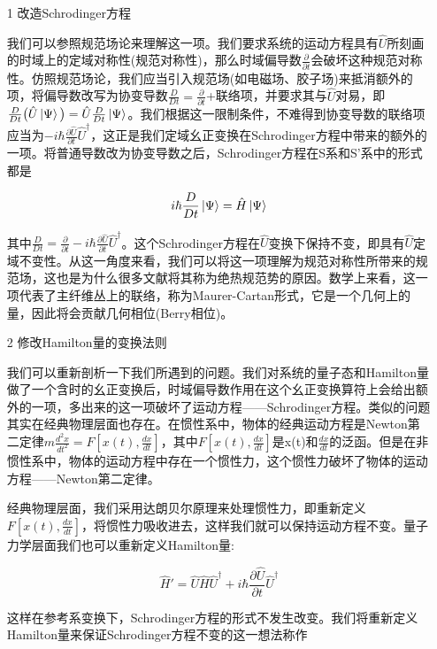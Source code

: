 \documentclass[a4paper]{article}
\begin{document}
        \begin{itemize}
            \item[1] 改造Schrodinger方程
                
                我们可以参照规范场论来理解这一项。我们要求系统的运动方程具有$\hat{U}$所刻画的时域上的定域对称性(规范对称性)，那么时域偏导数$\frac{\partial}{\partial t}$会破坏这种规范对称性。仿照规范场论，我们应当引入规范场(如电磁场、胶子场)来抵消额外的项，将偏导数改写为协变导数$\frac{D}{Dt}=\frac{\partial}{\partial t}$+联络项，并要求其与$\hat{U}$对易，即$\frac{D}{Dt}\big(\hat{U}\ket{\Psi}\big)=\hat{U}\frac{D}{Dt}\ket{\Psi}$。我们根据这一限制条件，不难得到协变导数的联络项应当为$-i\hbar\frac{\partial\hat{U}}{\partial t}\hat{U}^\dagger$，这正是我们定域幺正变换在Schrodinger方程中带来的额外的一项。将普通导数改为协变导数之后，Schrodinger方程在S系和S'系中的形式都是
    
                \begin{equation}
                    i\hbar\frac{D}{Dt}\ket{\Psi} = \hat{H}\ket{\Psi}
                \end{equation}
    
                其中$\frac{D}{Dt}=\frac{\partial}{\partial t}-i\hbar\frac{\partial\hat{U}}{\partial t}\hat{U}^\dagger$。这个Schrodinger方程在$\hat{U}$变换下保持不变，即具有$\hat{U}$定域不变性。从这一角度来看，我们可以将这一项理解为规范对称性所带来的规范场，这也是为什么很多文献将其称为绝热规范势的原因。数学上来看，这一项代表了主纤维丛上的联络，称为Maurer-Cartan形式，它是一个几何上的量，因此将会贡献几何相位(Berry相位)。
            
            \item[2] 修改Hamilton量的变换法则
                
                我们可以重新剖析一下我们所遇到的问题。我们对系统的量子态和Hamilton量做了一个含时的幺正变换后，时域偏导数作用在这个幺正变换算符上会给出额外的一项，多出来的这一项破坏了运动方程——Schrodinger方程。类似的问题其实在经典物理层面也存在。在惯性系中，物体的经典运动方程是Newton第二定律$m\frac{d^2x}{dt^2}=F[x(t),\frac{dx}{dt}]$，其中$F[x(t),\frac{dx}{dt}]$是x(t)和$\frac{dx}{dt}$的泛函。但是在非惯性系中，物体的运动方程中存在一个惯性力，这个惯性力破坏了物体的运动方程——Newton第二定律。
    
                经典物理层面，我们采用达朗贝尔原理来处理惯性力，即重新定义$F[x(t),\frac{dx}{dt}]$，将惯性力吸收进去，这样我们就可以保持运动方程不变。量子力学层面我们也可以重新定义Hamilton量:
                
                \begin{equation}
                    \hat{H}'=\hat{U}\hat{H}\hat{U}^\dagger + i\hbar\frac{\partial\hat{U}}{\partial t}\hat{U}^\dagger
                \end{equation}
    
                这样在参考系变换下，Schrodinger方程的形式不发生改变。我们将重新定义Hamilton量来保证Schrodinger方程不变的这一想法称作\cite{bib:eleven}
                
            \end{itemize}
        
\end{document}
